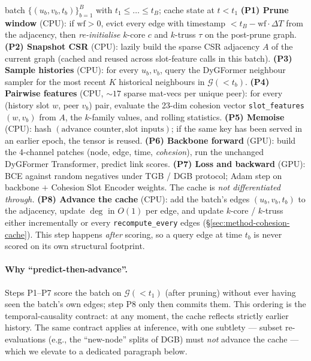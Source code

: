 \documentclass[sigconf,nonacm,review]{acmart}
\newcommand{\eg}{e.g.,\xspace}
\newcommand{\Gcal}{\mathcal{G}}
\begin{document}
\begin{algorithm}[t]
\caption{One Hawkeye training step (batch of $B$ chronological edges).}
\label{alg:trainstep}
\small
\begin{algorithmic}[1]
\Require batch $\{(u_b,v_b,t_b)\}_{b=1}^{B}$ with $t_1\le\ldots\le t_B$;
cache state at $t<t_1$
\State \textbf{(P1) Prune window} (CPU): if $\mathrm{wf}>0$, evict every
edge with timestamp $<\!t_B-\mathrm{wf}\cdot\Delta T$ from the adjacency,
then \emph{re-initialise} $k$-core $c$ and $k$-truss $\tau$ on the post-prune graph.
\State \textbf{(P2) Snapshot CSR} (CPU): lazily build the sparse CSR
adjacency $A$ of the current graph (cached and reused across slot-feature
calls in this batch).
\State \textbf{(P3) Sample histories} (CPU): for every $u_b,v_b$, query the
DyGFormer neighbour sampler for the most recent $K$ historical neighbours
in $\Gcal(<t_b)$.
\State \textbf{(P4) Pairwise features} (CPU, $\sim 17$ sparse mat-vecs per
unique peer): for every (history slot $w$, peer $v_b$) pair, evaluate the
23-dim cohesion vector \texttt{slot\_features}$(w,v_b)$ from $A$, the
$k$-family values, and rolling statistics.
\State \textbf{(P5) Memoise} (CPU): hash $(\text{advance counter},
\text{slot inputs})$; if the same key has been served in an earlier epoch,
the tensor is reused.
\State \textbf{(P6) Backbone forward} (GPU): build the 4-channel patches
(node, edge, time, \emph{cohesion}), run the unchanged DyGFormer
Transformer, predict link scores.
\State \textbf{(P7) Loss and backward} (GPU): BCE against random negatives
under TGB / DGB protocol; Adam step on backbone $+$ Cohesion Slot Encoder
weights. The cache is \emph{not differentiated through.}
\State \textbf{(P8) Advance the cache} (CPU): add the batch's edges
$(u_b,v_b,t_b)$ to the adjacency, update $\deg$ in $O(1)$ per edge, and
update $k$-core / $k$-truss either incrementally or every
\texttt{recompute\_every} edges (\S\ref{sec:method-cohesion-cache}).
This step happens \emph{after} scoring, so a query edge at time $t_b$ is
never scored on its own structural footprint.
\end{algorithmic}
\end{algorithm}

\paragraph{Why ``predict-then-advance''.}
Steps P1--P7 score the batch on $\Gcal(<t_1)$ (after pruning) without ever
having seen the batch's own edges; step P8 only then commits them. This
ordering is the temporal-causality contract: at any moment, the cache
reflects strictly earlier history. The same contract applies at
inference, with one subtlety --- subset re-evaluations (\eg{} the
``new-node'' splits of DGB) must \emph{not} advance the cache --- which we
elevate to a dedicated paragraph below.
\end{document}
